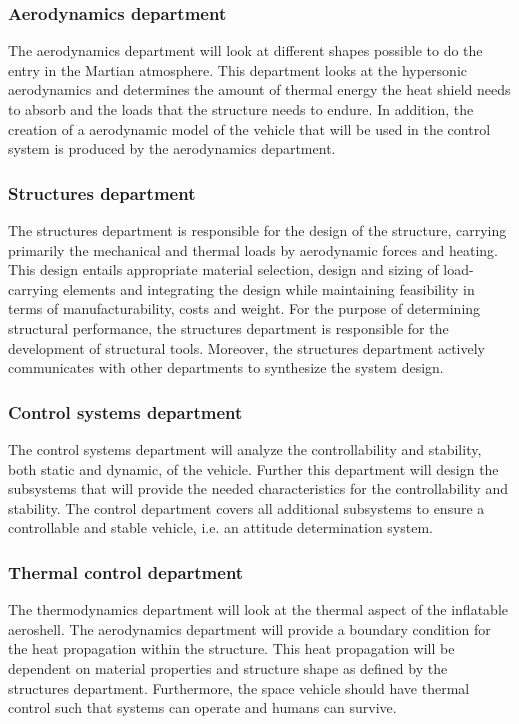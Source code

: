 \subsubsection{Aerodynamics department}\label{subsec:aero}
The aerodynamics department will look at different shapes possible to do the entry in the Martian atmosphere. This department looks at the hypersonic aerodynamics and determines the amount of thermal energy the heat shield needs to absorb and the loads that the structure needs to endure. In addition, the creation of a aerodynamic model of the vehicle that will be used in the control system is produced by the aerodynamics department.

\subsubsection{Structures department}\label{subsec:struct}
The structures department is responsible for the design of the structure, carrying primarily the mechanical and thermal loads by aerodynamic forces and heating. This design entails appropriate material selection, design and sizing of load-carrying elements and integrating the design while maintaining feasibility in terms of manufacturability, costs and weight. For the purpose of determining structural performance, the structures department is responsible for the development of structural tools. Moreover, the structures department actively communicates with other departments to synthesize the system design.

\subsubsection{Control systems department}\label{subsec:control}
The control systems department will analyze the controllability and stability, both static and dynamic, of the vehicle. Further this department will design the subsystems that will provide the needed characteristics for the controllability and stability. The control department covers all additional subsystems to ensure a controllable and stable vehicle, i.e. an attitude determination system.

\subsubsection{Thermal control department}\label{subsec:therm}
The thermodynamics department will look at the thermal aspect of the inflatable aeroshell. The aerodynamics department will provide a boundary condition for the heat propagation within the structure. This heat propagation will be dependent on material properties and structure shape as defined by the structures department. Furthermore, the space vehicle should have thermal control such that systems can operate and humans can survive.